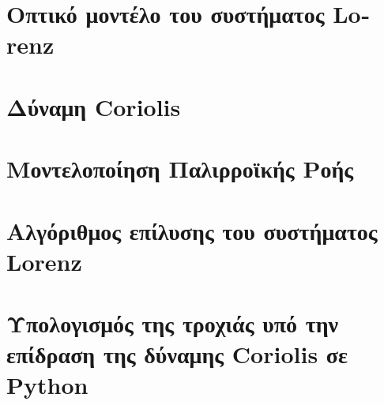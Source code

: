 \documentclass[12pt, a4paper, oneside]{article}
\numberwithin{equation}{subsection}
\def\lat#1{\textlatin{#1}}
\begin{document}
		\listoffigures
		\thispagestyle{pagenum}
	\cleardoublepage

		\listoftables
		\thispagestyle{pagenum}
	\cleardoublepage

		\lstlistoflistings
		\thispagestyle{pagenum}
	\cleardoublepage

	\section{Οπτικό μοντέλο του συστήματος \lat{Lorenz}}
		
	\cleardoublepage
	\section{Δύναμη \lat{Coriolis}}
		
	\cleardoublepage
	\section{Μοντελοποίηση Παλιρροϊκής Ροής}
	\cleardoublepage
	\nocite{*}
	\lat{}

	\cleardoublepage



	\appendix
		\section{Αλγόριθμος επίλυσης του συστήματος \textlatin{Lorenz}}
		\pagestyle{appendix}
		\label{sec:lorenzPython}
		\lstset{style=withnums}
		
		\cleardoublepage
		\section{Υπολογισμός της τροχιάς υπό την επίδραση της δύναμης Coriolis σε \textlatin{Python}}
		\pagestyle{appendix}
		\label{sec:corPython}
		\lstset{style=withnums}
		
 
\end{document}
